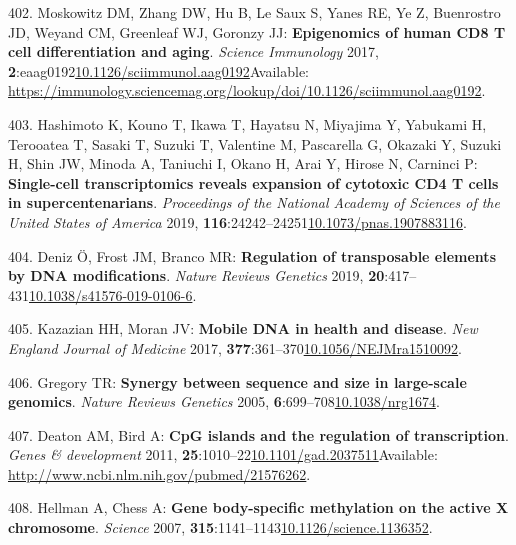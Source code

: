 \documentclass[
]{book}
\begin{document}
\leavevmode\hypertarget{ref-Moskowitz2017}{}%
402. Moskowitz DM, Zhang DW, Hu B, Le Saux S, Yanes RE, Ye Z, Buenrostro JD, Weyand CM, Greenleaf WJ, Goronzy JJ: \textbf{Epigenomics of human CD8 T cell differentiation and aging}. \emph{Science Immunology} 2017, \textbf{2}:eaag0192\href{https://doi.org/10.1126/sciimmunol.aag0192}{10.1126/sciimmunol.aag0192}Available: \url{https://immunology.sciencemag.org/lookup/doi/10.1126/sciimmunol.aag0192}.

\leavevmode\hypertarget{ref-Hashimoto2019}{}%
403. Hashimoto K, Kouno T, Ikawa T, Hayatsu N, Miyajima Y, Yabukami H, Terooatea T, Sasaki T, Suzuki T, Valentine M, Pascarella G, Okazaki Y, Suzuki H, Shin JW, Minoda A, Taniuchi I, Okano H, Arai Y, Hirose N, Carninci P: \textbf{Single-cell transcriptomics reveals expansion of cytotoxic CD4 T cells in supercentenarians}. \emph{Proceedings of the National Academy of Sciences of the United States of America} 2019, \textbf{116}:24242--24251\href{https://doi.org/10.1073/pnas.1907883116}{10.1073/pnas.1907883116}.

\leavevmode\hypertarget{ref-Deniz2019}{}%
404. Deniz Ö, Frost JM, Branco MR: \textbf{Regulation of transposable elements by DNA modifications}. \emph{Nature Reviews Genetics} 2019, \textbf{20}:417--431\href{https://doi.org/10.1038/s41576-019-0106-6}{10.1038/s41576-019-0106-6}.

\leavevmode\hypertarget{ref-Kazazian2017}{}%
405. Kazazian HH, Moran JV: \textbf{Mobile DNA in health and disease}. \emph{New England Journal of Medicine} 2017, \textbf{377}:361--370\href{https://doi.org/10.1056/NEJMra1510092}{10.1056/NEJMra1510092}.

\leavevmode\hypertarget{ref-Gregory2005}{}%
406. Gregory TR: \textbf{Synergy between sequence and size in large-scale genomics}. \emph{Nature Reviews Genetics} 2005, \textbf{6}:699--708\href{https://doi.org/10.1038/nrg1674}{10.1038/nrg1674}.

\leavevmode\hypertarget{ref-Deaton2011}{}%
407. Deaton AM, Bird A: \textbf{CpG islands and the regulation of transcription}. \emph{Genes \& development} 2011, \textbf{25}:1010--22\href{https://doi.org/10.1101/gad.2037511}{10.1101/gad.2037511}Available: \url{http://www.ncbi.nlm.nih.gov/pubmed/21576262}.

\leavevmode\hypertarget{ref-Hellman2007}{}%
408. Hellman A, Chess A: \textbf{Gene body-specific methylation on the active X chromosome}. \emph{Science} 2007, \textbf{315}:1141--1143\href{https://doi.org/10.1126/science.1136352}{10.1126/science.1136352}.
\end{document}
